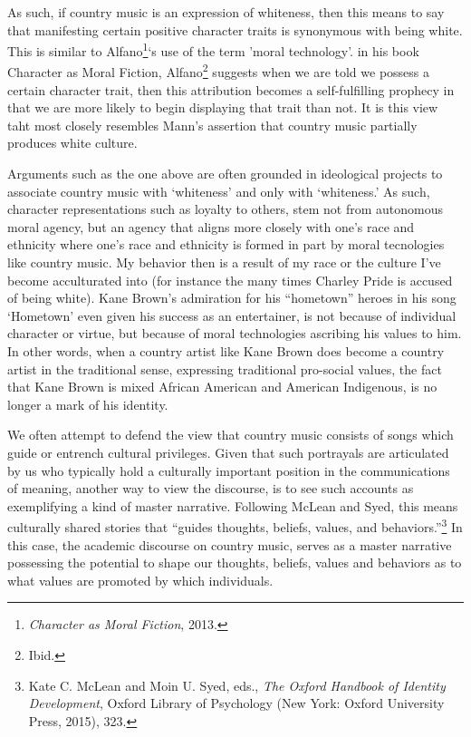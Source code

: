 \documentclass[
  12pt,
]{book}
\theoremstyle{definition}
\theoremstyle{definition}
\theoremstyle{definition}
\theoremstyle{definition}
\theoremstyle{remark}
\begin{document}
As such, if country music is an expression of whiteness, then this means to say that manifesting certain positive character traits is synonymous with being white. This is similar to Alfano\footnote{\emph{Character as Moral Fiction}, 2013.}`s use of the term 'moral technology'. in his book Character as Moral Fiction, Alfano\footnote{Ibid.} suggests when we are told we possess a certain character trait, then this attribution becomes a self-fulfilling prophecy in that we are more likely to begin displaying that trait than not. It is this view taht most closely resembles Mann's assertion that country music partially produces white culture.

Arguments such as the one above are often grounded in ideological projects to associate country music with `whiteness' and only with `whiteness.' As such, character representations such as loyalty to others, stem not from autonomous moral agency, but an agency that aligns more closely with one's race and ethnicity where one's race and ethnicity is formed in part by moral tecnologies like country music. My behavior then is a result of my race or the culture I've become acculturated into (for instance the many times Charley Pride is accused of being white). Kane Brown's admiration for his ``hometown'' heroes in his song `Hometown' even given his success as an entertainer, is not because of individual character or virtue, but because of moral technologies ascribing his values to him. In other words, when a country artist like Kane Brown does become a country artist in the traditional sense, expressing traditional pro-social values, the fact that Kane Brown is mixed African American and American Indigenous, is no longer a mark of his identity.

We often attempt to defend the view that country music consists of songs which guide or entrench cultural privileges. Given that such portrayals are articulated by us who typically hold a culturally important position in the communications of meaning, another way to view the discourse, is to see such accounts as exemplifying a kind of master narrative. Following McLean and Syed, this means culturally shared stories that ``guides thoughts, beliefs, values, and behaviors.''\footnote{Kate C. McLean and Moin U. Syed, eds., \emph{The {Oxford} Handbook of Identity Development}, Oxford Library of Psychology (New York: Oxford University Press, 2015), 323.} In this case, the academic discourse on country music, serves as a master narrative possessing the potential to shape our thoughts, beliefs, values and behaviors as to what values are promoted by which individuals.
\end{document}
